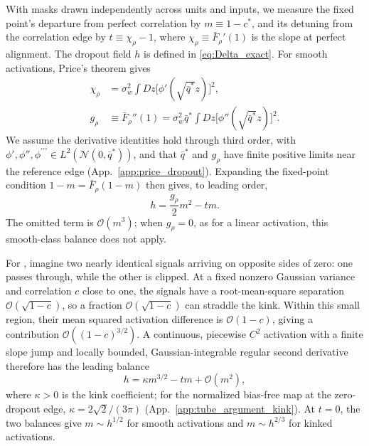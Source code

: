 With masks drawn independently across units and inputs, we measure the fixed point's departure from perfect correlation by $m\equiv1-c^*$, and its detuning from the correlation edge by $t\equiv\chi_\rho-1$, where $\chi_\rho\equiv\bar F_\rho'(1)$ is the slope at perfect alignment. The dropout field $h$ is defined in \eqref{eq:Delta_exact}. For smooth activations, Price's theorem gives
\begin{align}
\chi_\rho &= \sigma_w^2\int Dz \big[\phi'(\sqrt{\bar q^{*}} z)\big]^2,
\label{eq:chi_dropout}\\
g_\rho &\equiv \bar F_\rho''(1) = \sigma_w^2 \bar q^{*}\int Dz \big[\phi''(\sqrt{\bar q^{*}} z)\big]^2.
\label{eq:g_dropout}
\end{align}
We assume the derivative identities hold through third order, with $\phi',\phi'',\phi^{\prime\prime\prime}\in L^2(\mathcal N(0,\bar q^*))$, and that $\bar q^*$ and $g_\rho$ have finite positive limits near the reference edge (App.~\ref{app:price_dropout}). Expanding the fixed-point condition $1-m=\bar F_\rho(1-m)$ then gives, to leading order,
\begin{equation}
h = \frac{g_\rho}{2}m^2-tm.
\label{eq:EoS_correct}
\end{equation}
The omitted term is $\mathcal O(m^3)$; when $g_\rho=0$, as for a linear activation, this smooth-class balance does not apply.

For \relu{}, imagine two nearly identical signals arriving on opposite sides of zero: one passes through, while the other is clipped. At a fixed nonzero Gaussian variance and correlation $c$ close to one, the signals have a root-mean-square separation $\mathcal O(\sqrt{1-c})$, so a fraction $\mathcal O(\sqrt{1-c})$ can straddle the kink. Within this small region, their mean squared activation difference is $\mathcal O(1-c)$, giving a contribution $\mathcal O((1-c)^{3/2})$. A continuous, piecewise $C^2$ activation with a finite slope jump and locally bounded, Gaussian-integrable regular second derivative therefore has the leading balance
\begin{equation}
h=\kappa m^{3/2}-tm+\mathcal O(m^2),
\label{eq:eos_kink_again}
\end{equation}
where $\kappa>0$ is the kink coefficient; for the normalized bias-free \relu{} map at the zero-dropout edge, $\kappa=2\sqrt{2}/(3\pi)$ (App.~\ref{app:tube_argument_kink}). At $t=0$, the two balances give $m\sim h^{1/2}$ for smooth activations and $m\sim h^{2/3}$ for kinked activations.

